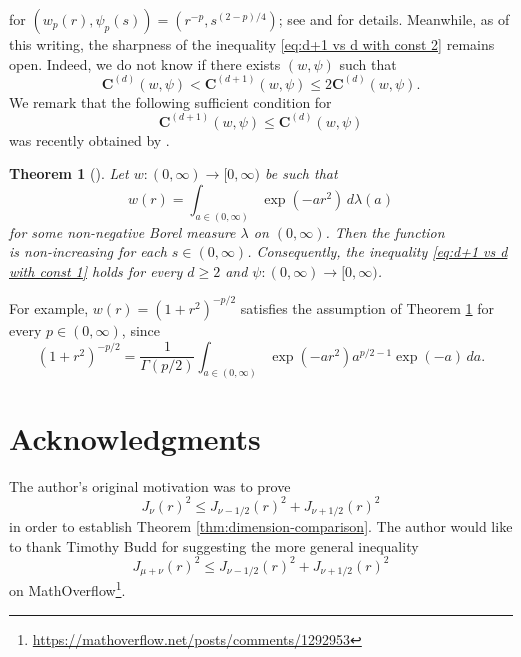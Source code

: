 \documentclass[reqno,letterpaper]{amsart}
\numberwithin{equation}{section}
\theoremstyle{plain}
\newtheorem{theorem}{Theorem}[section]
\newcommand{\Tnu}[1]{T_{#1}}
\newcommand{\Const}{\bm{C}}
\newcommand{\Constwpd}[3]{\Const^{(#3)}(#1, #2)}
\newcommand{\BesselJ}[1]{J_{#1}}
\newcommand{\intervaloo}[2]{(#1, #2)}
\newcommand{\intervalco}[2]{[#1, #2)}
\newcommand{\intervalcc}[2]{[#1, #2]}
\begin{document}
for
$
( w_p(r) , \psi_p(s) ) = ( r^{-p}, s^{(2-p)/4} )
$;
see \cite[Theorem 1.6]{BS2017} and \citet[Theorem 1.8]{Suz2025} for details.
Meanwhile, as of this writing, the sharpness of the inequality \eqref{eq:d+1 vs d with const 2} remains open.
Indeed, we do not know if there exists $(w, \psi)$ such that
\begin{equation}
	\Constwpd{w}{\psi}{d} < \Constwpd{w}{\psi}{d+1} \leq 2 \Constwpd{w}{\psi}{d} .
\end{equation}
We remark that the following sufficient condition for
\begin{equation} \label{eq:d+1 vs d with const 1}
	\Constwpd{w}{\psi}{d+1} \leq \Constwpd{w}{\psi}{d} 
\end{equation}
was recently obtained by \citet{Suz2025_2}.
\begin{theorem}[{\cite[Theorem 1.8]{Suz2025_2}}] \label{thm:CM}
	Let $w \colon \intervaloo{0}{\infty} \to \intervalco{0}{\infty}$ be such that
	\begin{equation}
		w(r) = \int_{a \in \intervaloo{0}{\infty}} \exp(- a r^2) \, d\lambda(a)
	\end{equation} 
	for some non-negative Borel measure $\lambda$ on $\intervaloo{0}{\infty}$. 
	Then the function
	\begin{equation}
		\intervalco{0}{\infty} \ni \nu \longmapsto \Tnu{\nu}w(s) \in \intervalcc{0}{\infty}
	\end{equation}
	is non-increasing for each $s \in \intervaloo{0}{\infty}$. 
	Consequently, the inequality \eqref{eq:d+1 vs d with const 1} holds for every $d \geq 2$ and $\psi \colon \intervaloo{0}{\infty} \to \intervalco{0}{\infty}$.
\end{theorem}
For example, $w(r) = (1+r^2)^{-p/2}$ satisfies the assumption of Theorem \ref{thm:CM} for every $p \in \intervaloo{0}{\infty}$, since
\begin{equation}
	(1+r^2)^{-p/2}  = \frac{1}{\Gamma(p/2)} \int_{a \in \intervaloo{0}{\infty}} \exp(-a r^2) a^{p/2-1} \exp(-a) \, da .
\end{equation}
	\section*{Acknowledgments}
The author's original motivation was to prove
	\begin{equation} 
\BesselJ{\nu}(r)^2 \leq \BesselJ{\nu-1/2}(r)^2 + \BesselJ{\nu+1/2}(r)^2 
	\end{equation}
	in order to establish Theorem \ref{thm:dimension-comparison}. 
The author would like to thank Timothy Budd for suggesting the more general inequality
	\begin{equation} 
\BesselJ{\mu + \nu}(r)^2 \leq \BesselJ{\nu-1/2}(r)^2 + \BesselJ{\nu+1/2}(r)^2 
	\end{equation}
	on MathOverflow\footnote{\url{https://mathoverflow.net/posts/comments/1292953}}.
	
\end{document}
